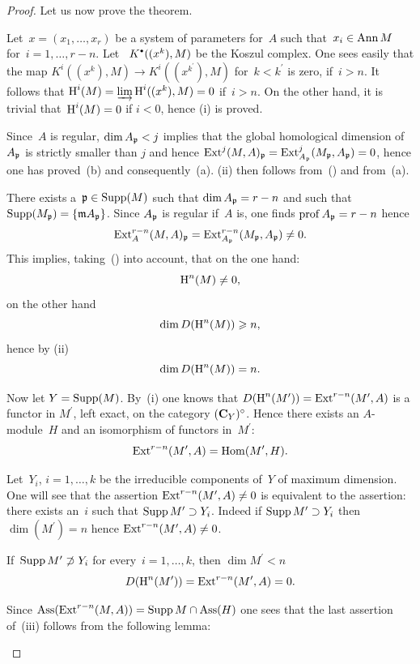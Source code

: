 \begin{proof}
Let us now prove the theorem.
\begin{enumeratei}
\item
Let~$x=(x_{1},\dots, x_{r})$ be a system of parameters for~$A$ such that~$x_{i}\in\operatorname{Ann} M$ for~$i=1,\dots, r-n$. Let~ $K^{\boule}((x^{k}), M)$ be the Koszul complex. One sees easily that the map $K^{i}((x^{k}), M)\to K^{i}((x^{k^{\prime}}), M)$ for~$k<k^{\prime}$ is zero, if~$i>n$. It follows that $\operatorname{H}^{i}(M)=\varinjlim\operatorname{H}^{i}((x^{k}), M)=0$ if~$i>n$. On the other hand, it is trivial that~$\operatorname{H}^{i}(M)=0$ if $i<0$, hence (i) is proved.

\item
Since~$A$ is regular, $\dim A_{\mathfrak{p}}<j$ implies that the global homological dimension of $A_{\mathfrak{p}}$ is strictly smaller than $j$ and hence $\operatorname{Ext}^{j}(M, A)_{\mathfrak{p}}=\operatorname{Ext}_{A_{\mathfrak{p}}}^{j}(M_{\mathfrak{p}}, A_{\mathfrak{p}})=\nobreak0$, hence one has proved~(b) and consequently~(a). (ii) then follows from~() and from~(a).

\item
There exists a~$\mathfrak{p}\in\operatorname{Supp}(M)$ such that $\dim A_{\mathfrak{p}}=r-n$ and such that $\operatorname{Supp}(M_{\mathfrak{p}})=\{ \mathfrak{m} A_{\mathfrak{p}}\}$. Since $A_{\mathfrak{p}}$ is regular if~$A$ is, one finds $\operatorname{prof} A_{\mathfrak{p}}=r-n$ hence
\begin{equation} \label{eq:V.23} \operatorname{Ext}_{A}^{r-n}(M, A)_{\mathfrak{p}}=\operatorname{Ext}_{A_{\mathfrak{p}}}^{r-n}(M_{\mathfrak{p}}, A_{\mathfrak{p}})\neq 0.
\end{equation}
This implies, taking~() into account, that on the one hand:
\[
\operatorname{H}^{n}(M)\neq 0,
\]
on the other hand
\[
\dim D(\operatorname{H}^{n}(M))\geqslant n,
\]
hence by (ii)
\[
\dim D(\operatorname{H}^{n}(M))=n.
\]

Now let $Y=\operatorname{Supp}(M)$. By~(i) one knows that $D(\operatorname{H}^{n}(M^{\prime}))=\operatorname{Ext}^{r-n}(M^{\prime}, A)$ is a functor in $M^{\prime}$, left exact, on the category $(\mathbf{C}_{Y})^{\circ}$. Hence there exists an $A$-module~$H$ and an isomorphism of functors in~$M^{\prime}$:
\[
\operatorname{Ext}^{r-n}(M^{\prime}, A)=\operatorname{Hom}(M^{\prime}, H).
\]

Let~$Y_{i}$, $i=1,\dots, k$ be the irreducible components of~$Y$ of maximum dimension. One will see that the assertion $\operatorname{Ext}^{r-n}(M^{\prime}, A)\neq 0$ is equivalent to the assertion: there exists an~$i$ such that $\operatorname{Supp} M^{\prime}\supset Y_{i}$. Indeed if $\operatorname{Supp} M^{\prime}\supset Y_{i}$ then $\dim(M^{\prime})=n$ hence $\operatorname{Ext}^{r-n}(M^{\prime}, A)\neq 0$.

If~$\operatorname{Supp} M^{\prime}\not\supset Y_{i}$ for every~$i=1,\dots, k$, then $\dim M^{\prime}<n$
\[
D(\operatorname{H}^{n}(M^{\prime}))=\operatorname{Ext}^{r-n}(M^{\prime}, A)=0.
\]

Since $\operatorname{Ass}(\operatorname{Ext}^{r-n}(M, A))=\operatorname{Supp} M\cap\operatorname{Ass} (H)$ one sees that the last assertion of~(iii) follows from the following lemma:
\end{enumeratei}


\end{proof}
